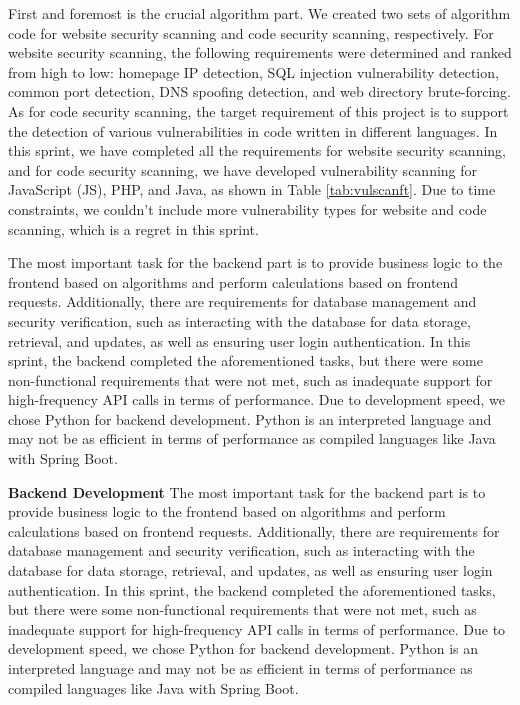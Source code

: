 \documentclass[journal]{IEEEtran}
\begin{document}
First and foremost is the crucial algorithm part. We created two sets of algorithm code for website security scanning and code security scanning, respectively. For website security scanning, the following requirements were determined and ranked from high to low: homepage IP detection, SQL injection vulnerability detection, common port detection, DNS spoofing detection, and web directory brute-forcing. As for code security scanning, the target requirement of this project is to support the detection of various vulnerabilities in code written in different languages. In this sprint, we have completed all the requirements for website security scanning, and for code security scanning, we have developed vulnerability scanning for JavaScript (JS), PHP, and Java, as shown in Table \ref{tab:vulscanft}. Due to time constraints, we couldn't include more vulnerability types for website and code scanning, which is a regret in this sprint.



The most important task for the backend part is to provide business logic to the frontend based on algorithms and perform calculations based on frontend requests. Additionally, there are requirements for database management and security verification, such as interacting with the database for data storage, retrieval, and updates, as well as ensuring user login authentication. In this sprint, the backend completed the aforementioned tasks, but there were some non-functional requirements that were not met, such as inadequate support for high-frequency API calls in terms of performance. Due to development speed, we chose Python for backend development. Python is an interpreted language and may not be as efficient in terms of performance as compiled languages like Java with Spring Boot.

\textbf{Backend Development}
The most important task for the backend part is to provide business logic to the frontend based on algorithms and perform calculations based on frontend requests. Additionally, there are requirements for database management and security verification, such as interacting with the database for data storage, retrieval, and updates, as well as ensuring user login authentication. In this sprint, the backend completed the aforementioned tasks, but there were some non-functional requirements that were not met, such as inadequate support for high-frequency API calls in terms of performance. Due to development speed, we chose Python for backend development. Python is an interpreted language and may not be as efficient in terms of performance as compiled languages like Java with Spring Boot.
\end{document}
